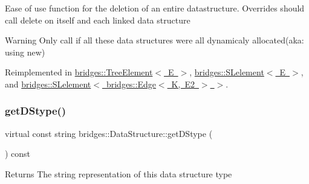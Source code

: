 Ease of use function for the deletion of an entire datastructure. Overrides should call delete on itself and each linked data structure

\begin{DoxyWarning}{Warning}
Only call if all these data structures were all dynamicaly allocated(aka\+: using new) 
\end{DoxyWarning}


Reimplemented in \mbox{\hyperlink{classbridges_1_1_tree_element_aad832c9f8dfd7e92c7b06a825f406e1d}{bridges\+::\+Tree\+Element$<$ E $>$}}, \mbox{\hyperlink{classbridges_1_1_s_lelement_ac747648849874407e9d907bb4557dd52}{bridges\+::\+S\+Lelement$<$ E $>$}}, and \mbox{\hyperlink{classbridges_1_1_s_lelement_ac747648849874407e9d907bb4557dd52}{bridges\+::\+S\+Lelement$<$ bridges\+::\+Edge$<$ K, E2 $>$ $>$}}.

\mbox{\label{classbridges_1_1_data_structure_a957a63b106e340bc753620c650632bdc}} 
\subsubsection{\texorpdfstring{get\+D\+Stype()}{getDStype()}}
{\footnotesize\ttfamily virtual const string bridges\+::\+Data\+Structure\+::get\+D\+Stype (\begin{DoxyParamCaption}{ }\end{DoxyParamCaption}) const\hspace{0.3cm}{\ttfamily [pure virtual]}}

\begin{DoxyReturn}{Returns}
The string representation of this data structure type 
\end{DoxyReturn}


